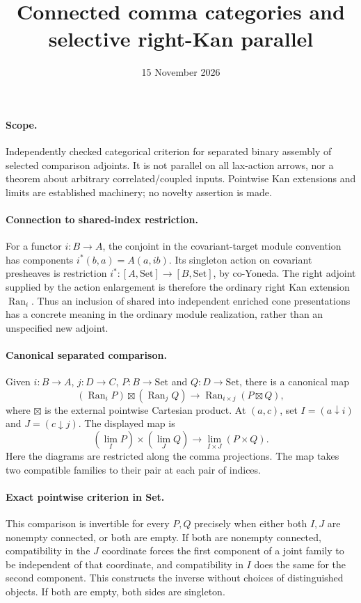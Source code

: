 \documentclass{article}
\title{Connected comma categories and selective right-Kan parallel}
\date{15 November 2026}
\begin{document}
\maketitle
\paragraph{Scope.} Independently checked categorical criterion for separated binary assembly of selected comparison adjoints. It is not parallel on all lax-action arrows, nor a theorem about arbitrary correlated/coupled inputs. Pointwise Kan extensions and limits are established machinery; no novelty assertion is made.

\paragraph{Connection to shared-index restriction.} For a functor $i:B\to A$, the conjoint in the covariant-target module convention has components $i^*(b,a)=A(a,ib)$. Its singleton action on covariant presheaves is restriction $i^*:[A,\mathrm{Set}]\to[B,\mathrm{Set}]$, by co-Yoneda. The right adjoint supplied by the action enlargement is therefore the ordinary right Kan extension $\operatorname{Ran}_i$. Thus an inclusion of shared into independent enriched cone presentations has a concrete meaning in the ordinary module realization, rather than an unspecified new adjoint.

\paragraph{Canonical separated comparison.} Given $i:B\to A$, $j:D\to C$, $P:B\to\mathrm{Set}$ and $Q:D\to\mathrm{Set}$, there is a canonical map
\[
 (\operatorname{Ran}_i P)\boxtimes(\operatorname{Ran}_j Q)
 \longrightarrow\operatorname{Ran}_{i\times j}(P\boxtimes Q),
\]
where $\boxtimes$ is the external pointwise Cartesian product. At $(a,c)$, set $I=(a\downarrow i)$ and $J=(c\downarrow j)$. The displayed map is
\[
 (\lim_I P)\times(\lim_J Q)\longrightarrow
 \lim_{I\times J}(P\times Q).
\]
Here the diagrams are restricted along the comma projections. The map takes two compatible families to their pair at each pair of indices.

\paragraph{Exact pointwise criterion in Set.} This comparison is invertible for every $P,Q$ precisely when either both $I,J$ are nonempty connected, or both are empty. If both are nonempty connected, compatibility in the $J$ coordinate forces the first component of a joint family to be independent of that coordinate, and compatibility in $I$ does the same for the second component. This constructs the inverse without choices of distinguished objects. If both are empty, both sides are singleton.
\end{document}
